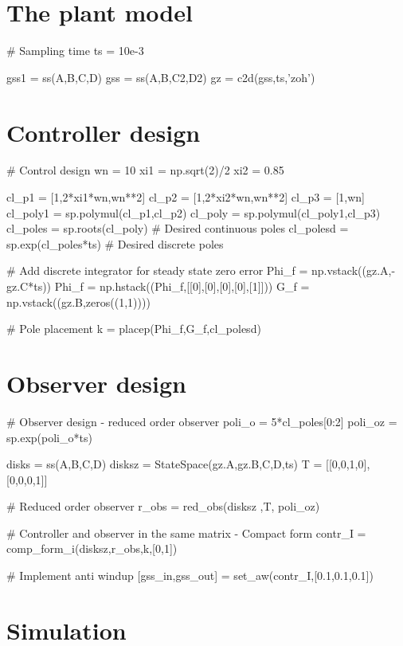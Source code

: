 \section{The plant model}

\begin{code}
# Sampling time
ts = 10e-3

gss1 = ss(A,B,C,D)
gss = ss(A,B,C2,D2)
gz = c2d(gss,ts,'zoh')
\end{code}

\section{Controller design}

\begin{code}
# Control design
wn = 10
xi1 = np.sqrt(2)/2 
xi2 = 0.85 

cl_p1 = [1,2*xi1*wn,wn**2]
cl_p2 = [1,2*xi2*wn,wn**2]
cl_p3 = [1,wn]
cl_poly1 = sp.polymul(cl_p1,cl_p2)
cl_poly = sp.polymul(cl_poly1,cl_p3)
cl_poles = sp.roots(cl_poly)     # Desired continuous poles
cl_polesd = sp.exp(cl_poles*ts)  # Desired discrete poles

# Add discrete integrator for steady state zero error
Phi_f = np.vstack((gz.A,-gz.C*ts))
Phi_f = np.hstack((Phi_f,[[0],[0],[0],[0],[1]]))
G_f = np.vstack((gz.B,zeros((1,1))))

# Pole placement
k = placep(Phi_f,G_f,cl_polesd)
\end{code}

\section{Observer design}
\begin{code}
# Observer design - reduced order observer
poli_o = 5*cl_poles[0:2]
poli_oz = sp.exp(poli_o*ts) 

disks = ss(A,B,C,D)
disksz = StateSpace(gz.A,gz.B,C,D,ts)
T = [[0,0,1,0],[0,0,0,1]]

# Reduced order observer
r_obs = red_obs(disksz ,T, poli_oz)

# Controller and observer in the same matrix -  Compact form
contr_I = comp_form_i(disksz,r_obs,k,[0,1])

# Implement anti windup
[gss_in,gss_out] = set_aw(contr_I,[0.1,0.1,0.1])
\end{code}

\section{Simulation}

